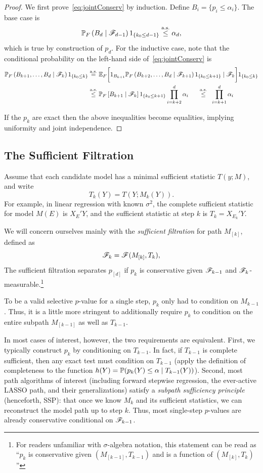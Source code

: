 \documentclass{article}
\begin{document}
\begin{proof}
  We first prove~\eqref{eq:jointConserv}
  by induction. Define $B_i = \{p_i \leq \alpha_i\}$. 
  The base case is
  \[
  \P_F\left(B_d \mid \sF_{d-1}\right)1_{\{k_0 \leq d-1\}} \leqAS \alpha_d,
  \]
  which is true by construction of $p_d$. 
  For the inductive case, note that the
  conditional probability on the left-hand side
  of~\eqref{eq:jointConserv} is
  \begin{align*}
    \P_F\left(B_{k+1}, \ldots, B_d
      \mid \sF_k\right)1_{\{k_0 \leq k\}} 
    &\eqAS \E_F\bigg[ 1_{B_{k+1}} 
    \P_F\left(B_{k+2}, \ldots, B_d
      \mid \sF_{k+1}\right)1_{\{k_0 \leq k+1\}}
    \mid \sF_k\bigg]1_{\{k_0 \leq k\}}\\
    &\leqAS \P_F\left[ B_{k+1}
      \mid \sF_k\right]1_{\{k_0 \leq k+1\}}\prod_{i=k+2}^d \alpha_i
    \quad\;\;\leqAS\;\; \prod_{i=k+1}^d \alpha_i
  \end{align*}

  If the $p_k$ are exact then the above 
  inequalities become equalities, implying uniformity and joint independence.
\end{proof}

\subsection{The Sufficient Filtration}\label{sec:suffFilt}

Assume that each candidate model has a minimal sufficient statistic $T(y; M)$, and write
\[
T_k(Y) = T(Y; M_k(Y)).
\]
For example, in linear regression with known $\sigma^2$, the complete sufficient statistic for model $M(E)$ is $X_E'Y$, and the sufficient statistic at step $k$ is $T_k = X_{E_k}'Y$. 

We will concern ourselves mainly with the {\em sufficient filtration} for path $M_{[k]}$, defined as
\[
\sF_k = \sF(M_{[k]}, T_k),
\]
The sufficient filtration separates $p_{[d]}$ if $p_k$ is conservative given $\sF_{k-1}$ and $\sF_k$-measurable.\footnote{For readers unfamiliar with $\sigma$-algebra notation, this statement can be read as ``$p_k$ is conservative given $(M_{[k-1]}, T_{k-1})$ and is a function of $(M_{[k]}, T_k)$''}

To be a valid selective $p$-value for a single step, $p_k$ only had to condition on $M_{k-1}$. Thus, it is a little more stringent to additionally require $p_k$ to condition on the entire subpath $M_{[k-1]}$ as well as $T_{k-1}$.

In most cases of interest, however, the two requirements are equivalent. First, we typically construct $p_k$ by conditioning on $T_{k-1}$. In fact, if $T_{k-1}$ is complete sufficient, then any exact test must condition on $T_{k-1}$ (apply the definition of completeness to the function $h(Y) = \P(p_k(Y) \leq \alpha \mid T_{k-1}(Y))$). Second, most path algorithms of interest (including forward stepwise regression, the ever-active LASSO path, and their generalizations) satisfy a {\em subpath sufficiency principle} (henceforth, SSP): that once we know $M_k$ and its sufficient statistics, we can reconstruct the model path up to step $k$. Thus, most single-step $p$-values are already conservative conditional on $\sF_{k-1}$.
\end{document}
